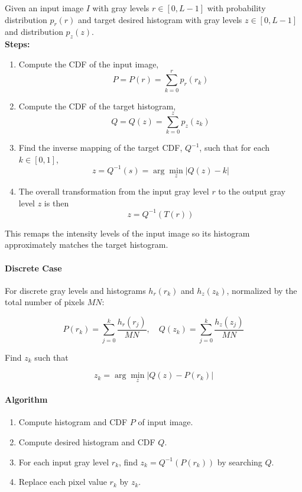 Given an input image $I$ with gray levels \( r \in [0, L-1] \) with probability distribution \( p_r(r) \) and target desired histogram with gray levels \( z \in [0, L-1] \) and distribution \( p_z(z) \).\\
\textbf{Steps:}
\begin{enumerate}
  \item Compute the CDF of the input image,
  \[
  P = P(r) = \sum_{k=0}^{r} p_r(r_k)
  \]    
  
  \item Compute the CDF of the target histogram,
  \[
  Q = Q(z) = \sum_{k=0}^{z} p_z(z_k)
  \]
  
  \item Find the inverse mapping of the target CDF, \( Q^{-1} \), such that for each \( k \in [0,1] \),
  \[
  z = Q^{-1}(s) = \arg \min_z |Q(z) - k|
  \]
  
  \item The overall transformation from the input gray level \( r \) to the output gray level \( z \) is then
  \[
  z = Q^{-1}(T(r))
  \]
\end{enumerate}

This remaps the intensity levels of the input image so its histogram approximately matches the target histogram.

\paragraph{Discrete Case}

For discrete gray levels and histograms \( h_r(r_k) \) and \( h_z(z_k) \), normalized by the total number of pixels \( MN \):

\[
P(r_k) = \sum_{j=0}^k \frac{h_r(r_j)}{MN}, \quad
Q(z_k) = \sum_{j=0}^k \frac{h_z(z_j)}{MN}
\]

Find \( z_k \) such that

\[
z_k = \arg \min_{z} |Q(z) - P(r_k)|
\]

\paragraph{Algorithm}
\begin{enumerate}
  \item Compute histogram and CDF \( P \) of input image.
  \item Compute desired histogram and CDF \( Q \).
  \item For each input gray level \( r_k \), find \( z_k = Q^{-1}(P(r_k)) \) by searching \( Q \).
  \item Replace each pixel value \( r_k \) by \( z_k \).
\end{enumerate}

